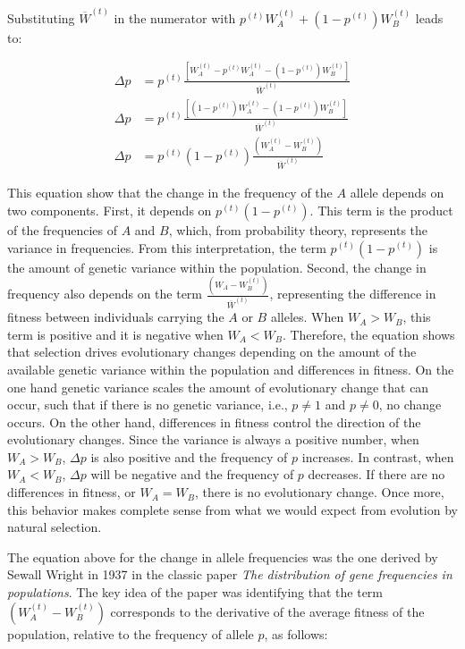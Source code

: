 \documentclass[
]{book}
\begin{document}
Substituting \(\overline{W}^{(t)}\) in the numerator with \(p^{(t)}W_{A}^{(t)}+(1-p^{(t)})W_{B}^{(t)}\) leads to:

\[\begin{aligned}
\Delta p&=p^{(t)}\frac{\left[W_{A}^{(t)}-p^{(t)}W_{A}^{(t)}-(1-p^{(t)})W_{B}^{(t)}\right]}{\overline{W}^{(t)}} \\
\Delta p&=p^{(t)}\frac{\left[(1-p^{(t)})W_{A}^{(t)}-(1-p^{(t)})W_{B}^{(t)}\right]}{\overline{W}^{(t)}} \\
\Delta p&=p^{(t)}(1-p^{(t)})\frac{\left(W_{A}^{(t)}-W_{B}^{(t)}\right)}{\overline{W}^{(t)}}
\end{aligned}\]

This equation show that the change in the frequency of the \(A\) allele depends on two components. First, it depends on \(p^{(t)}(1-p^{(t)})\). This term is the product of the frequencies of \(A\) and \(B\), which, from probability theory, represents the variance in frequencies. From this interpretation, the term \(p^{(t)}(1-p^{(t)})\) is the amount of genetic variance within the population. Second, the change in frequency also depends on the term \(\frac{\left(W_{A}-W_{B}^{(t)}\right)}{\overline{W}^{(t)}}\), representing the difference in fitness between individuals carrying the \(A\) or \(B\) alleles. When \(W_{A}>W_{B}\), this term is positive and it is negative when \(W_{A}<W_{B}\). Therefore, the equation shows that selection drives evolutionary changes depending on the amount of the available genetic variance within the population and differences in fitness. On the one hand genetic variance scales the amount of evolutionary change that can occur, such that if there is no genetic variance, i.e., \(p\neq 1\) and \(p\neq 0\), no change occurs. On the other hand, differences in fitness control the direction of the evolutionary changes. Since the variance is always a positive number, when \(W_{A}>W_{B}\), \(\Delta p\) is also positive and the frequency of \(p\) increases. In contrast, when \(W_{A}<W_{B}\), \(\Delta p\) will be negative and the frequency of \(p\) decreases. If there are no differences in fitness, or \(W_{A} = W_{B}\), there is no evolutionary change. Once more, this behavior makes complete sense from what we would expect from evolution by natural selection.

The equation above for the change in allele frequencies was the one derived by Sewall Wright in 1937 in the classic paper \emph{The distribution of gene frequencies in populations}. The key idea of the paper was identifying that the term \(\left(W_{A}^{(t)}-W_{B}^{(t)}\right)\) corresponds to the derivative of the average fitness of the population, relative to the frequency of allele \(p\), as follows:
\end{document}
